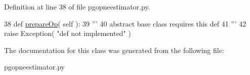 Definition at line 38 of file pgopneestimator.\+py.


\begin{DoxyCode}
38     \textcolor{keyword}{def }\hyperlink{classnegui_1_1pgopneestimator_1_1PGOpNeEstimator_a37628c8a837a75a542ae82947dc367fd}{prepareOp}( self ):
39         \textcolor{stringliteral}{'''}
40 \textcolor{stringliteral}{        abstract base class requires this def}
41 \textcolor{stringliteral}{        '''}
42         \textcolor{keywordflow}{raise} Exception( \textcolor{stringliteral}{"def not implemented"} )
\end{DoxyCode}


The documentation for this class was generated from the following file\+:\begin{DoxyCompactItemize}
\item 
pgopneestimator.\+py\end{DoxyCompactItemize}
